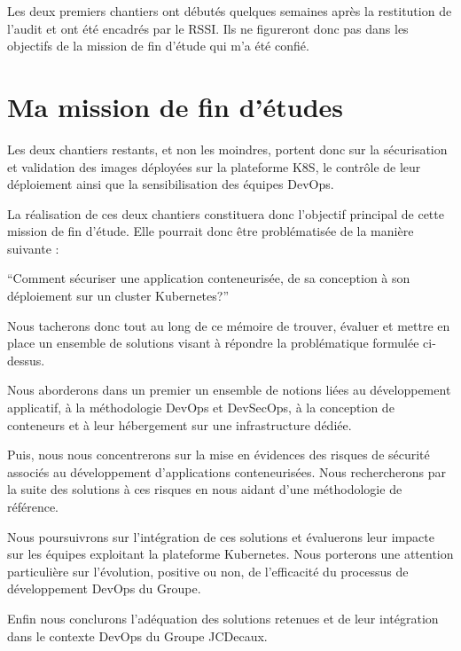 Les deux premiers chantiers ont débutés quelques semaines après la restitution de l'audit et ont été encadrés par le \ac{RSSI}.
Ils ne figureront donc pas dans les objectifs de la mission de fin d'étude qui m'a été confié.

\newpage

\section{Ma mission de fin d'études}
Les deux chantiers restants, et non les moindres, portent donc sur la sécurisation et validation des images déployées sur
la plateforme \ac{K8S}, le contrôle de leur déploiement ainsi que la sensibilisation des équipes DevOps.

La réalisation de ces deux chantiers constituera donc l'objectif principal de cette mission de fin d'étude.
Elle pourrait donc être problématisée de la manière suivante : 
\begin{center}
    \color{bluejcd}  \enquote{Comment sécuriser une application conteneurisée, de sa conception à son déploiement sur un
     cluster Kubernetes?}
\end{center}

Nous tacherons donc tout au long de ce mémoire de trouver, évaluer et mettre en place un ensemble de solutions visant
à répondre la problématique formulée ci-dessus.

Nous aborderons dans un premier un ensemble de notions liées au développement applicatif, à la méthodologie DevOps 
et DevSecOps, à la conception de conteneurs et à leur hébergement sur une infrastructure dédiée.

Puis, nous nous concentrerons sur la mise en évidences des risques de sécurité associés au développement 
d'applications conteneurisées. Nous rechercherons par la suite des solutions à ces risques en nous aidant d'une 
méthodologie de référence.

Nous poursuivrons sur l'intégration de ces solutions et évaluerons leur impacte sur les équipes exploitant la plateforme
Kubernetes. Nous porterons une attention particulière sur l'évolution, positive ou non, de l'efficacité du processus de 
développement DevOps du Groupe.

Enfin nous conclurons l'adéquation des solutions retenues et de leur intégration dans le contexte DevOps du Groupe JCDecaux.



